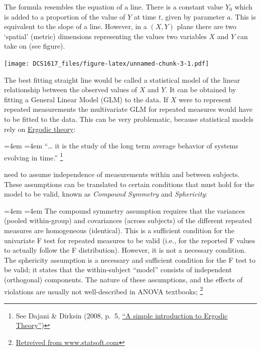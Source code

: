 \documentclass[]{book}
\let\rmarkdownfootnote\footnote%
\def\footnote{\protect\rmarkdownfootnote}
\renewenvironment{quote}{%
  \par \small \medskip \block
  \leftskip=4em \rightskip=4em%
  \noindent \ignorespaces}{%
  \par \medskip
  }
\begin{document}
The formula resembles the equation of a line. There is a constant value
\(Y_{0}\) which is added to a proportion of the value of \(Y\) at time
\(t\), given by parameter \(a\). This is equivalent to the slope of a
line. However, in a \((X,Y)\) plane there are two `spatial' (metric)
dimensions representing the values two variables \(X\) and \(Y\) can
take on (see figure).

\texttt{[image: DCS1617\_files/figure-latex/unnamed-chunk-3-1.pdf]}

The best fitting straight line would be called a statistical model of
the linear relationship between the observed values of \(X\) and \(Y\).
It can be obtained by fitting a General Linear Model (GLM) to the data.
If \(X\) were to represent repeated measurements the multivariate GLM
for repeated measures would have to be fitted to the data. This can be
very problematic, because statistical models rely on
\href{https://en.wikipedia.org/wiki/Ergodic_theory}{Ergodic theory}:

\begin{quote}
``\ldots{} it is the study of the long term average behavior of systems
evolving in time.'' \footnote{See Dajani \& Dirksin (2008, p.~5,
  \href{http://www.staff.science.uu.nl/~kraai101/lecturenotes2009.pdf}{``A
  simple introduction to Ergodic Theory''})}
\end{quote}

need to assume independence of measurements within and between subjects.
These assumptions can be translated to certain conditions that must hold
for the model to be valid, known as \emph{Compound Symmetry} and
\emph{Sphericity}:

\begin{quote}
The compound symmetry assumption requires that the variances (pooled
within-group) and covariances (across subjects) of the different
repeated measures are homogeneous (identical). This is a sufficient
condition for the univariate F test for repeated measures to be valid
(i.e., for the reported F values to actually follow the F distribution).
However, it is not a necessary condition. The sphericity assumption is a
necessary and sufficient condition for the F test to be valid; it states
that the within-subject ``model'' consists of independent (orthogonal)
components. The nature of these assumptions, and the effects of
violations are usually not well-described in ANOVA textbooks; \footnote{\href{https://www.statsoft.com/Textbook/ANOVA-MANOVA\#sphericity}{Retreived
  from www.statsoft.com}}
\end{quote}
\end{document}
